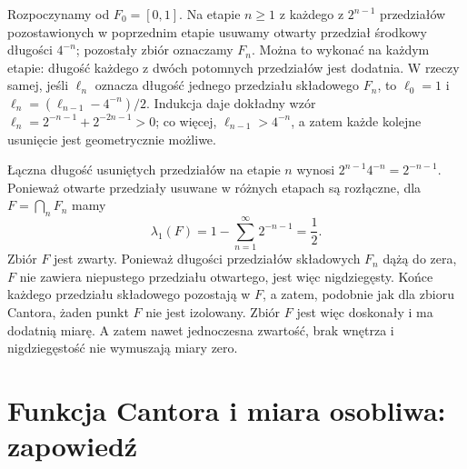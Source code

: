 \begin{przyklad}
\label{ex:fat-cantor}
Rozpoczynamy od $F_0=[0,1]$. Na etapie $n\ge1$
z każdego z $2^{n-1}$ przedziałów pozostawionych
w poprzednim etapie usuwamy otwarty przedział środkowy
długości $4^{-n}$; pozostały zbiór oznaczamy $F_n$.
Można to wykonać na każdym etapie: długość każdego
z dwóch potomnych przedziałów jest dodatnia.
W rzeczy samej, jeśli $\ell_n$ oznacza długość jednego
przedziału składowego $F_n$, to
$\ell_0=1$ i $\ell_n=(\ell_{n-1}-4^{-n})/2$.
Indukcja daje dokładny wzór
$\ell_n=2^{-n-1}+2^{-2n-1}>0$; co więcej,
$\ell_{n-1}>4^{-n}$, a zatem każde kolejne
usunięcie jest geometrycznie możliwe.

Łączna długość usuniętych przedziałów na etapie $n$
wynosi $2^{n-1}4^{-n}=2^{-n-1}$. Ponieważ otwarte
przedziały usuwane w różnych etapach są rozłączne,
dla $F=\bigcap_nF_n$ mamy
\[
\lambda_1(F)=1-\sum_{n=1}^\infty2^{-n-1}=\frac12.
\]
Zbiór $F$ jest zwarty. Ponieważ długości przedziałów
składowych $F_n$ dążą do zera, $F$ nie zawiera
niepustego przedziału otwartego, jest więc nigdziegęsty.
Końce każdego przedziału składowego pozostają w $F$,
a zatem, podobnie jak dla zbioru Cantora, żaden punkt
$F$ nie jest izolowany. Zbiór $F$ jest więc doskonały
i ma dodatnią miarę. A zatem nawet jednoczesna
zwartość, brak wnętrza i nigdziegęstość nie
wymuszają miary zero.
\end{przyklad}

\section{Funkcja Cantora i miara osobliwa: zapowiedź}

